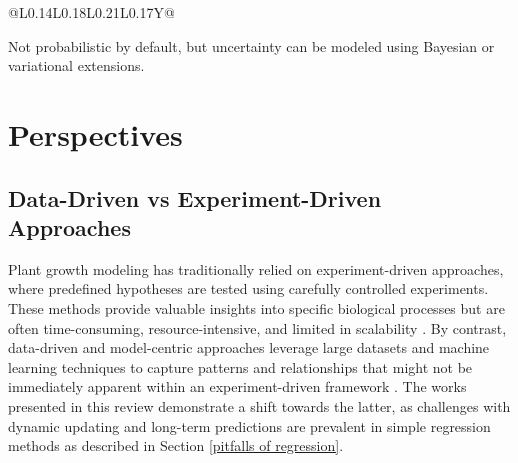 \documentclass{article}
\begin{document}
\begin{table}[h]
\begin{threeparttable}
\begin{tabularx}{\textwidth}{@{\extracolsep{\fill}}L{0.14\textwidth}L{0.18\textwidth}L{0.21\textwidth}L{0.17\textwidth}Y@{}}
    \bottomrule
    \end{tabularx}
    \begin{tablenotes}
        \item[\textdagger] \small{Not probabilistic by default, but uncertainty can be modeled using Bayesian or variational extensions.}
        \end{tablenotes}
    \end{threeparttable}
\end{table}


\section{Perspectives}
\label{sec:perspectives}
\subsection{Data-Driven vs Experiment-Driven Approaches}
Plant growth modeling has traditionally relied on experiment-driven approaches, where predefined hypotheses are tested using carefully controlled experiments. 
These methods provide valuable insights into specific biological processes but are often time-consuming, resource-intensive, and limited in scalability \cite{akhavizadegan2021time,suliansyah2023literature,kephe2021challenges}. 
By contrast, data-driven and model-centric approaches leverage large datasets and machine learning techniques to capture patterns and relationships that might not be immediately apparent within an experiment-driven framework \cite{roscher2023datacentricdigitalagricultureperspective}. The works presented in this review demonstrate a shift towards the latter, as challenges with dynamic updating and long-term predictions are prevalent in simple regression methods as described in Section \ref{pitfalls of regression}. 
\end{document}
